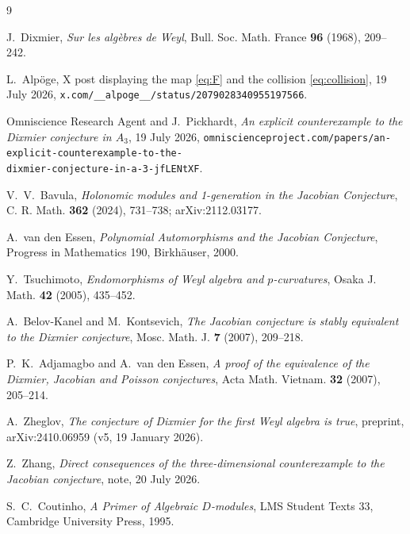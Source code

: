 \documentclass[11pt]{article}
\theoremstyle{remark}
\begin{document}
\begin{thebibliography}{9}

J.~Dixmier, \emph{Sur les alg\`ebres de Weyl}, Bull. Soc. Math. France
\textbf{96} (1968), 209--242.

L.~Alp\"oge, X post displaying the map \eqref{eq:F} and the collision
\eqref{eq:collision}, 19 July 2026,
\texttt{x.com/\_\_alpoge\_\_/status/2079028340955197566}.

Omniscience Research Agent and J.~Pickhardt, \emph{An explicit
counterexample to the Dixmier conjecture in $A_3$}, 19 July 2026,
\texttt{omniscienceproject.com/papers/an-explicit-counterexample-to-the-\\
dixmier-conjecture-in-a-3-jfLENtXF}.

V.~V.~Bavula, \emph{Holonomic modules and 1-generation in the Jacobian
Conjecture}, C. R. Math. \textbf{362} (2024), 731--738; arXiv:2112.03177.

A.~van den Essen, \emph{Polynomial Automorphisms and the Jacobian
Conjecture}, Progress in Mathematics 190, Birkh\"auser, 2000.

Y.~Tsuchimoto, \emph{Endomorphisms of Weyl algebra and $p$-curvatures},
Osaka J. Math. \textbf{42} (2005), 435--452.

A.~Belov-Kanel and M.~Kontsevich, \emph{The Jacobian conjecture is stably
equivalent to the Dixmier conjecture}, Mosc. Math. J. \textbf{7} (2007),
209--218.

P.~K.~Adjamagbo and A.~van den Essen, \emph{A proof of the equivalence of
the Dixmier, Jacobian and Poisson conjectures}, Acta Math. Vietnam.
\textbf{32} (2007), 205--214.

A.~Zheglov, \emph{The conjecture of Dixmier for the first Weyl algebra is
true}, preprint, arXiv:2410.06959 (v5, 19 January 2026).

Z.~Zhang, \emph{Direct consequences of the three-dimensional counterexample
to the Jacobian conjecture}, note, 20 July 2026.

S.~C.~Coutinho, \emph{A Primer of Algebraic $D$-modules}, LMS Student Texts
33, Cambridge University Press, 1995.

\end{thebibliography}
\end{document}
